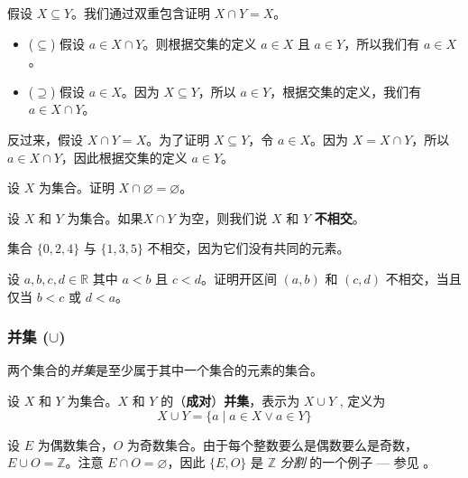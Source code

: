 \begin{cproof}
假设 $X \subseteq Y$。我们通过双重包含证明 $X \cap Y = X$。
\begin{itemize}
\item ($\subseteq$) 假设 $a \in X \cap Y$。则根据交集的定义 $a \in X$ 且 $a \in Y$，所以我们有 $a \in X$。
\item ($\supseteq$) 假设 $a \in X$。因为 $X \subseteq Y$，所以 $a \in Y$，根据交集的定义，我们有 $a \in X \cap Y$。
\end{itemize}

反过来，假设 $X \cap Y = X$。为了证明 $X \subseteq Y$，令 $a \in X$。因为 $X = X \cap Y$，所以 $a \in X \cap Y$，因此根据交集的定义 $a \in Y$。
\end{cproof}

\begin{exercise}
设 $X$ 为集合。证明 $X \cap \varnothing = \varnothing$。
\end{exercise}

\begin{definition}
\label{defDisjoint}
设 $X$ 和 $Y$ 为集合。如果$X \cap Y$ 为空，则我们说 $X$ 和 $Y$ \textbf{不相交}。
\end{definition}

\begin{example}
集合 $\{ 0,2,4 \}$ 与 $\{ 1,3,5 \}$ 不相交，因为它们没有共同的元素。
\end{example}

\begin{exercise}
设 $a,b,c,d \in \mathbb{R}$ 其中 $a<b$ 且 $c<d$。证明开区间 $(a,b)$ 和 $(c,d)$ 不相交，当且仅当 $b<c$ 或 $d<a$。
\end{exercise}

\subsubsection*{并集 ($\cup$)}
两个集合的\textit{并集}是至少属于其中一个集合的元素的集合。

\begin{definition}
\label{defUnion}
设 $X$ 和 $Y$ 为集合。$X$ 和 $Y$ 的（\textbf{成对}）\textbf{并集}，表示为 $X \cup Y$ , 定义为
\[ X \cup Y = \{ a \mid a \in X \vee a \in Y \} \]
\end{definition}

\begin{example}
设 $E$ 为偶数集合，$O$ 为奇数集合。由于每个整数要么是偶数要么是奇数，$E \cup O = \mathbb{Z}$。注意 $E \cap O = \varnothing$，因此 $\{E,O\}$ 是 $\mathbb{Z}$ \textit{分割} 的一个例子 --- 参见 。
\end{example}

